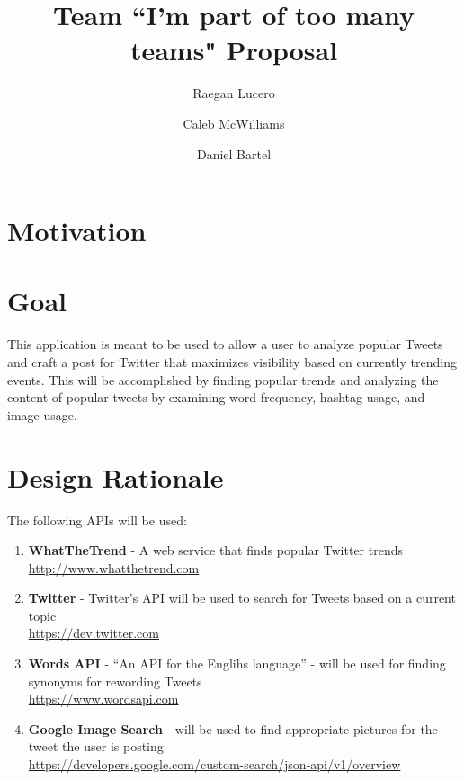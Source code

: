 \documentclass{article}
\title{Team ``I'm part of too many teams" Proposal}
\date{}
\author{
	Raegan Lucero
	\and
	 Caleb McWilliams
	\and
	 Daniel Bartel
 }
\begin{document}
\maketitle

\section*{Motivation}



\section*{Goal}

This application is meant to be used to allow a user to analyze popular Tweets and craft a post for Twitter that maximizes visibility 
based on currently trending events. This will be accomplished by finding popular trends and analyzing the content of popular tweets by examining word frequency, hashtag usage, and image usage. 

\section*{Design Rationale}

The following APIs will be used:
\begin{enumerate}
  \item[\textbullet] \textbf{WhatTheTrend} - A web service that finds popular Twitter trends \\
    \url{http://www.whatthetrend.com}
  \item[\textbullet] \textbf{Twitter} - Twitter's API will be used to search for Tweets based on a current topic \\
    \url{https://dev.twitter.com}
  \item[\textbullet] \textbf{Words API} - ``An API for the Englihs language'' - will be used for finding synonyms for rewording Tweets \\ 
    \url{https://www.wordsapi.com}
  \item[\textbullet] \textbf{Google Image Search} - will be used to find appropriate pictures for the tweet the user is posting \\
    \url{https://developers.google.com/custom-search/json-api/v1/overview}
\end{enumerate}
	
\end{document}

